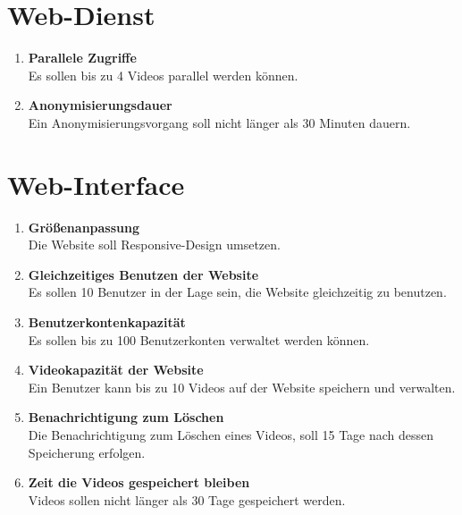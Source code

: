 \section{\gls{Web-Dienst}}
\begin{enumerate}
\renewcommand{\labelenumi}{\textbf{\theenumi}}
\renewcommand{\theenumi}{NA\arabic{enumi}0}
\setcounter{enumi}{199}

\item \label{na:paralleleZugriffe}\textbf{Parallele Zugriffe} \hfill\\  Es sollen bis zu 4 Videos parallel  werden können.

\item \textbf{Anonymisierungsdauer} \hfill\\  Ein Anonymisierungsvorgang soll nicht länger als 30 Minuten dauern.
\end{enumerate}

\section{\gls{Web-Interface}}
\begin{enumerate}
\renewcommand{\labelenumi}{\textbf{\theenumi}}
\renewcommand{\theenumi}{NA\arabic{enumi}0}
\setcounter{enumi}{299}

\item \textbf{Größenanpassung} \hfill\\  Die Website soll \gls{Responsive-Design} umsetzen.

\item \textbf{Gleichzeitiges Benutzen der Website} \hfill\\  Es sollen 10 Benutzer in der Lage sein, die Website gleichzeitig zu benutzen.

\item \textbf{Benutzerkontenkapazität} \hfill\\  Es sollen bis zu 100 Benutzerkonten verwaltet werden können.

\item \label{na:VideoKap}\textbf{Videokapazität der Website} \hfill\\  Ein Benutzer kann bis zu 10 Videos auf der Website speichern und verwalten.

\item \textbf{Benachrichtigung zum Löschen} \hfill\\  Die Benachrichtigung zum Löschen eines Videos, soll 15 Tage nach dessen Speicherung erfolgen.

\item \textbf{Zeit die Videos gespeichert bleiben} \hfill\\  Videos sollen nicht länger als 30 Tage gespeichert werden.
\end{enumerate}





